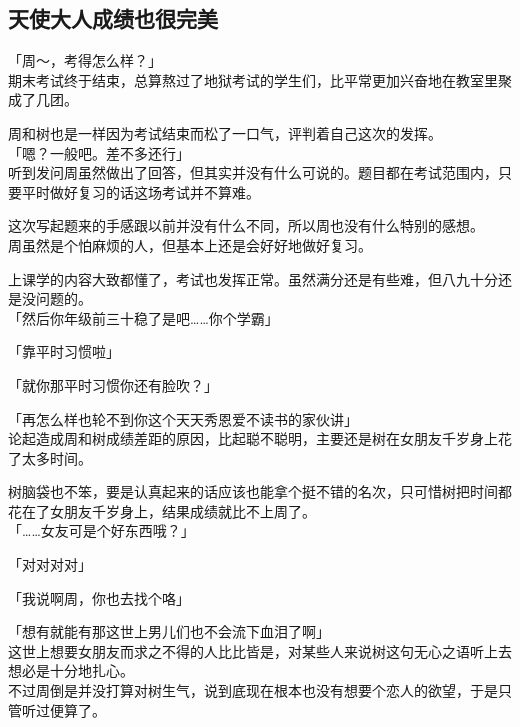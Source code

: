 \subsection{天使大人成绩也很完美}

「周～，考得怎么样？」\\

期末考试终于结束，总算熬过了地狱考试的学生们，比平常更加兴奋地在教室里聚成了几团。

周和树也是一样因为考试结束而松了一口气，评判着自己这次的发挥。\\

「嗯？一般吧。差不多还行」\\

听到发问周虽然做出了回答，但其实并没有什么可说的。题目都在考试范围内，只要平时做好复习的话这场考试并不算难。

这次写起题来的手感跟以前并没有什么不同，所以周也没有什么特别的感想。\\

周虽然是个怕麻烦的人，但基本上还是会好好地做好复习。

上课学的内容大致都懂了，考试也发挥正常。虽然满分还是有些难，但八九十分还是没问题的。\\

「然后你年级前三十稳了是吧……你个学霸」

「靠平时习惯啦」

「就你那平时习惯你还有脸吹？」

「再怎么样也轮不到你这个天天秀恩爱不读书的家伙讲」\\

论起造成周和树成绩差距的原因，比起聪不聪明，主要还是树在女朋友千岁身上花了太多时间。

树脑袋也不笨，要是认真起来的话应该也能拿个挺不错的名次，只可惜树把时间都花在了女朋友千岁身上，结果成绩就比不上周了。\\

「……女友可是个好东西哦？」

「对对对对」

「我说啊周，你也去找个咯」

「想有就能有那这世上男儿们也不会流下血泪了啊」\\

这世上想要女朋友而求之不得的人比比皆是，对某些人来说树这句无心之语听上去想必是十分地扎心。\\

不过周倒是并没打算对树生气，说到底现在根本也没有想要个恋人的欲望，于是只管听过便算了。\\

